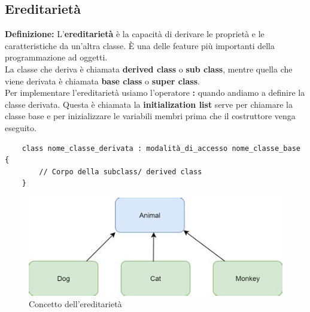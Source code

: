 \subsection{Ereditarietà}

\textsf{\small \textbf{Definizione: } L'\textbf{ereditarietà} è la capacità di derivare le proprietà e le caratteristiche da un'altra classe. È una delle feature più importanti della programmazione ad oggetti.} \\

\textsf{\small La classe che deriva è chiamata \textbf{derived class} o \textbf{sub class}, mentre quella che viene derivata è chiamata \textbf{base class} o \textbf{super class}.} \\

\textsf{\small Per implementare l'ereditarietà usiamo l'operatore \textbf{:} quando andiamo a definire la classe derivata. Questa è chiamata la \textbf{initialization list} serve per chiamare la classe base e per inizializzare le variabili membri prima che il costruttore venga eseguito.} \\

\begin{lstlisting}
	class nome_classe_derivata : modalità_di_accesso nome_classe_base {
		// Corpo della subclass/ derived class
	}
\end{lstlisting}

\begin{figure}[ht]
	\centering
	\includegraphics[width=1\textwidth, height=1\textheight, keepaspectratio]{./imgs/animal_class_uml.jpg}
	\caption{Concetto dell'ereditarietà}
	\label{fig:ereditarietà2}
\end{figure}

